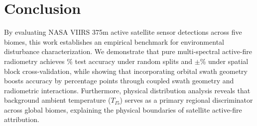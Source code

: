 \documentclass[conference]{IEEEtran}
\begin{document}
\section{Conclusion}
By evaluating \numDetections{} NASA VIIRS 375m active satellite sensor detections across five biomes, this work establishes an empirical benchmark for environmental disturbance characterization. We demonstrate that pure multi-spectral active-fire radiometry achieves \accRf{}\% test accuracy under random splits and \accSpatialBlockCv{}$\pm$\accSpatialBlockCvStd{}\% under spatial block cross-validation, while showing that incorporating orbital swath geometry boosts accuracy by \shortcutBoost{} percentage points through coupled swath geometry and radiometric interactions. Furthermore, physical distribution analysis reveals that background ambient temperature ($T_{I5}$) serves as a primary regional discriminator across global biomes, explaining the physical boundaries of satellite active-fire attribution.



\end{document}
